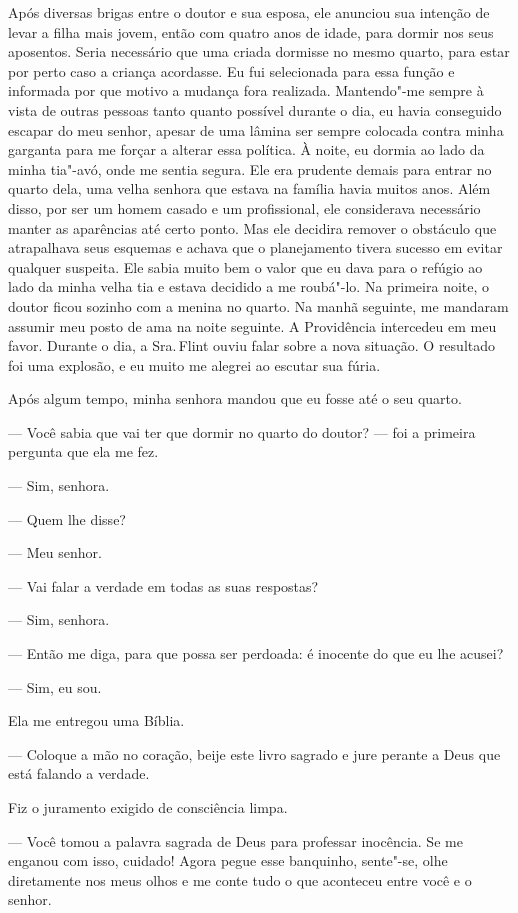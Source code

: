 Após diversas brigas entre o doutor e
sua esposa, ele anunciou sua intenção de levar a filha mais jovem, então
com quatro anos de idade, para dormir nos seus aposentos. Seria
necessário que uma criada dormisse no mesmo quarto, para estar por perto
caso a criança acordasse. Eu fui selecionada para essa função e
informada por que motivo a mudança fora realizada. Mantendo"-me sempre à
vista de outras pessoas tanto quanto possível durante o dia, eu havia
conseguido escapar do meu senhor, apesar de uma lâmina ser sempre
colocada contra minha garganta para me forçar a alterar essa política. À
noite, eu dormia ao lado da minha tia"-avó, onde me sentia segura. Ele
era prudente demais para entrar no quarto dela, uma velha senhora que
estava na família havia muitos anos. Além disso, por ser um homem casado
e um profissional, ele considerava necessário manter as aparências até
certo ponto. Mas ele decidira remover o obstáculo que atrapalhava seus
esquemas e achava que o planejamento tivera sucesso em evitar qualquer
suspeita. Ele sabia muito bem o valor que eu dava para o refúgio ao lado
da minha velha tia e estava decidido a me roubá"-lo. Na primeira noite, o
doutor ficou sozinho com a menina no quarto. Na manhã seguinte, me
mandaram assumir meu posto de ama na noite seguinte. A Providência
intercedeu em meu favor. Durante o dia, a Sra.\,Flint ouviu falar sobre a
nova situação. O resultado foi uma explosão, e eu muito me alegrei ao
escutar sua fúria.

Após algum tempo, minha senhora mandou
que eu fosse até o seu quarto.

--- Você sabia que vai ter que dormir no quarto do doutor? --- foi a
primeira pergunta que ela me fez.

--- Sim, senhora.

--- Quem lhe disse?

--- Meu senhor.

--- Vai falar a verdade em todas as
suas respostas?

--- Sim, senhora.

--- Então me diga, para que possa ser
perdoada: é inocente do que eu lhe acusei?

--- Sim, eu sou.

Ela me entregou uma Bíblia.

--- Coloque a mão no coração, beije este livro sagrado e jure perante a
Deus que está falando a verdade.

Fiz o juramento exigido de consciência
limpa.

--- Você tomou a palavra sagrada de
Deus para professar inocência. Se me enganou com isso, cuidado! Agora
pegue esse banquinho, sente"-se, olhe diretamente nos meus olhos e me
conte tudo o que aconteceu entre você e o senhor.

